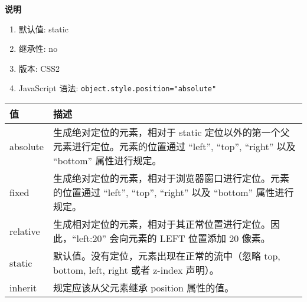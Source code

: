 \textbf{说明}

\begin{enumerate}
\def\labelenumi{\arabic{enumi}.}
\tightlist
\item
  默认值: static
\item
  继承性: no
\item
  版本: CSS2
\item
  JavaScript 语法: \lstinline!object.style.position="absolute"!
\end{enumerate}

\begin{longtable}[]{@{}ll@{}}
\toprule
\begin{minipage}[b]{0.49\columnwidth}\raggedright\strut
值\strut
\end{minipage} & \begin{minipage}[b]{0.44\columnwidth}\raggedright\strut
描述\strut
\end{minipage}\tabularnewline
\midrule
\endhead
\begin{minipage}[t]{0.49\columnwidth}\raggedright\strut
absolute\strut
\end{minipage} & \begin{minipage}[t]{0.44\columnwidth}\raggedright\strut
生成绝对定位的元素，相对于 static
定位以外的第一个父元素进行定位。元素的位置通过 ``left'', ``top'',
``right'' 以及 ``bottom'' 属性进行规定。\strut
\end{minipage}\tabularnewline
\begin{minipage}[t]{0.49\columnwidth}\raggedright\strut
fixed\strut
\end{minipage} & \begin{minipage}[t]{0.44\columnwidth}\raggedright\strut
生成绝对定位的元素，相对于浏览器窗口进行定位。元素的位置通过 ``left'',
``top'', ``right'' 以及 ``bottom'' 属性进行规定。\strut
\end{minipage}\tabularnewline
\begin{minipage}[t]{0.49\columnwidth}\raggedright\strut
relative\strut
\end{minipage} & \begin{minipage}[t]{0.44\columnwidth}\raggedright\strut
生成相对定位的元素，相对于其正常位置进行定位。因此，``left:20''
会向元素的 LEFT 位置添加 20 像素。\strut
\end{minipage}\tabularnewline
\begin{minipage}[t]{0.49\columnwidth}\raggedright\strut
static\strut
\end{minipage} & \begin{minipage}[t]{0.44\columnwidth}\raggedright\strut
默认值。没有定位，元素出现在正常的流中（忽略 top, bottom, left, right
或者 z-index 声明）。\strut
\end{minipage}\tabularnewline
\begin{minipage}[t]{0.49\columnwidth}\raggedright\strut
inherit\strut
\end{minipage} & \begin{minipage}[t]{0.44\columnwidth}\raggedright\strut
规定应该从父元素继承 position 属性的值。\strut
\end{minipage}\tabularnewline
\bottomrule
\end{longtable}

